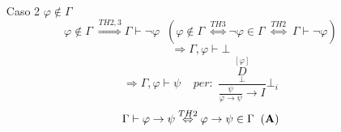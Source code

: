 \documentclass{article}
\theoremstyle{break}
\theoremstyle{break}
\theoremstyle{break}
\theoremstyle{break}
\begin{document}
\begin{itemize}
\begin{enumerate}
\begin{enumerate}
          \item [Caso 2] \( \varphi \notin \Gamma \) 
            \[
              \varphi \notin \Gamma \; \stackrel{TH2,3}{\Rightarrow} \Gamma \vdash \neg \varphi\;\; (\varphi \notin \Gamma\; \stackrel{TH3}{\Leftrightarrow} \neg \varphi \in \Gamma\; \stackrel{TH2}{\Leftrightarrow}\; \Gamma \vdash \neg \varphi)
            \]
            \[
            \Rightarrow \Gamma, \varphi \vdash \bot
            \] 
            \[
              \Rightarrow \Gamma, \varphi \vdash \psi\;\;\;\;per:\; \frac{\underset{\bot}{\stackrel{[\varphi]}{D}}}{\frac{\psi}{\varphi \to \psi}\to I}\bot_i
            \] 
            \[
              \Gamma \vdash \varphi \to \psi \stackrel{TH2}{\Leftrightarrow} \varphi \to \psi \in \Gamma\;\;(\text{\textbf{A}})
            \] 
        \end{enumerate}
    \end{enumerate}
\end{itemize}
\end{document}
